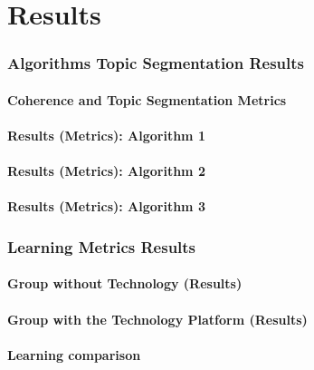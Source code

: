 \chapter{Results}
\label{chapter:chapter05}
\subsection{Algorithms Topic Segmentation Results}

\subsubsection{Coherence and Topic Segmentation Metrics}


\subsubsection{Results (Metrics): Algorithm 1}

\subsubsection{Results (Metrics): Algorithm 2}

\subsubsection{Results (Metrics): Algorithm 3}

\subsection{Learning Metrics Results}


\subsubsection{Group without Technology (Results)}

\subsubsection{Group with the Technology Platform (Results)}

\subsubsection{Learning comparison}